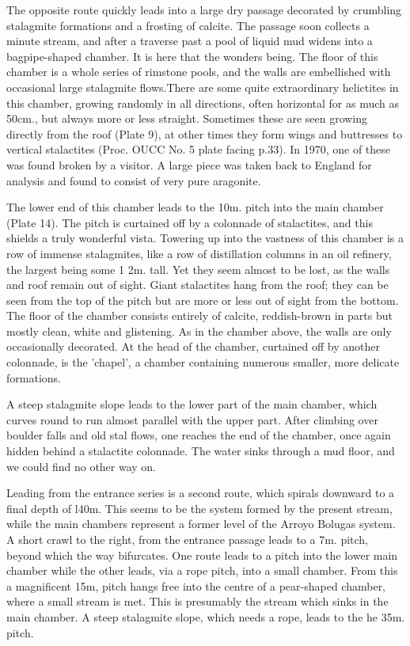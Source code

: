 \documentclass[11pt, a4paper, twoside]{memoir}
\begin{document}
The opposite route quickly leads into a large dry passage decorated by crumbling stalagmite formations and a frosting of calcite. The passage soon collects a minute stream, and after a traverse past a pool of liquid mud widens into a bagpipe-shaped chamber. It is here that the wonders being. The floor of this chamber is a whole series of rimstone pools, and the walls are embellished with occasional large stalagmite flows.There are some quite extraordinary helictites in this chamber, growing randomly in all directions, often horizontal for as much as 50cm., but always more or less straight. Sometimes these are seen growing directly from the roof (Plate 9), at other times they form wings and buttresses to vertical stalactites (Proc. OUCC No. 5 plate facing p.33). In 1970, one of these was found broken by a visitor. A large piece was taken back to England for analysis and found to consist of very pure aragonite.

The lower end of this chamber leads to the 10m. pitch into the main chamber (Plate 14). The pitch is curtained off by a colonnade of stalactites, and this shields a truly wonderful vista. Towering up into the vastness of this chamber is a row of immense stalagmites, like a row of distillation columns in an oil refinery, the largest being some 1 2m. tall. Yet they seem almost to be lost, as the walls and roof remain out of sight. Giant stalactites hang from the roof; they can be seen from the top of the pitch but are more or less out of sight from the bottom. The floor of the chamber consists entirely of calcite, reddish-brown in parts but mostly clean, white and glistening. As in the chamber above, the walls are only occasionally decorated. At the head of the chamber, curtained off by another colonnade, is the 'chapel', a chamber containing numerous smaller, more delicate formations.

A steep stalagmite slope leads to the lower part of the main chamber, which curves round to run almost parallel with the upper part. After climbing over boulder falls and old stal flows, one reaches the end of the chamber, once again hidden behind a stalactite colonnade. The water sinks through a mud floor, and we could find no other way on.

Leading from the entrance series is a second route, which spirals downward to a final depth of l40m. This seems to be the system formed by the present stream, while the main chambers represent a former level of the Arroyo Bolugas system. A short crawl to the right, from the entrance passage leads to a 7m. pitch, beyond which the way bifurcates. One route leads to a pitch into the lower main chamber while the other leads, via a rope pitch, into a small chamber. From this a magnificent 15m, pitch hangs free into the centre of a pear-shaped chamber, where a small stream is met. This is presumably the stream which sinks in the main chamber. A steep stalagmite slope, which needs a rope, leads to the he 35m. pitch.
\end{document}
